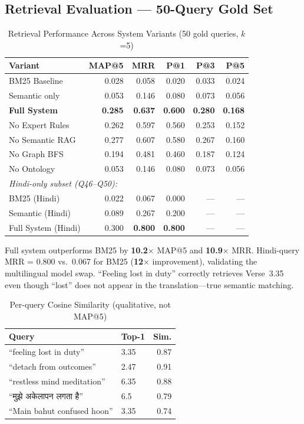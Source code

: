 \documentclass[conference]{IEEEtran}
\newcommand{\hi}[1]{{\hindifont #1}}
\begin{document}
\subsection{Retrieval Evaluation — 50-Query Gold Set}

\begin{table}[!t]
\caption{Retrieval Performance Across System Variants (50 gold queries, $k$=5)}
\label{tab:retrieval}
\centering
\begin{tabular}{@{}l rrrrr@{}}
\toprule
\textbf{Variant} & \textbf{MAP@5} & \textbf{MRR} & \textbf{P@1} & \textbf{P@3} & \textbf{P@5} \\
\midrule
BM25 Baseline     & 0.028 & 0.058 & 0.020 & 0.033 & 0.024 \\
Semantic only     & 0.053 & 0.146 & 0.080 & 0.073 & 0.056 \\
\textbf{Full System} & \textbf{0.285} & \textbf{0.637} & \textbf{0.600} & \textbf{0.280} & \textbf{0.168} \\
No Expert Rules   & 0.262 & 0.597 & 0.560 & 0.253 & 0.152 \\
No Semantic RAG   & 0.277 & 0.607 & 0.580 & 0.267 & 0.160 \\
No Graph BFS      & 0.194 & 0.481 & 0.460 & 0.187 & 0.124 \\
No Ontology       & 0.053 & 0.146 & 0.080 & 0.073 & 0.056 \\
\midrule
\multicolumn{6}{l}{\textit{Hindi-only subset (Q46--Q50):}} \\
BM25 (Hindi)      & 0.022 & 0.067 & 0.000 & --- & --- \\
Semantic (Hindi)  & 0.089 & 0.267 & 0.200 & --- & --- \\
Full System (Hindi)& 0.300 & \textbf{0.800} & \textbf{0.800} & --- & --- \\
\bottomrule
\end{tabular}
\end{table}

Full system outperforms BM25 by \textbf{10.2$\times$} MAP@5 and
\textbf{10.9$\times$} MRR. Hindi-query MRR = 0.800 vs.\ 0.067 for BM25
(\textbf{12$\times$} improvement), validating the multilingual model swap.
``Feeling lost in duty'' correctly retrieves Verse~3.35 even though ``lost''
does not appear in the translation—true semantic matching.

\begin{table}[htbp]
\caption{Per-query Cosine Similarity (qualitative, not MAP@5)}
\label{tab:rag}
\centering
\small
\begin{tabular}{@{}p{3.2cm}lr@{}}
\toprule
\textbf{Query} & \textbf{Top-1} & \textbf{Sim.} \\
\midrule
``feeling lost in duty''       & 3.35 & 0.87 \\
``detach from outcomes''       & 2.47 & 0.91 \\
``restless mind meditation''   & 6.35 & 0.88 \\
``\hi{मुझे अकेलापन लगता है}'' & 6.5  & 0.79 \\
``Main bahut confused hoon''   & 3.35 & 0.74 \\
\bottomrule
\end{tabular}
\end{table}
\end{document}
